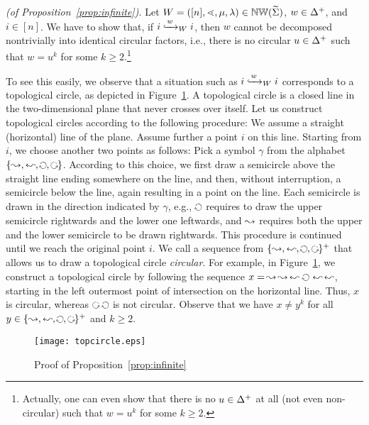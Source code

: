 \documentclass{LMCS}
\begin{document}
\begin{Proof}{\it (of Proposition~\ref{prop:infinite}).} Let $W =
  ([n],\succord,\mu,\lambda) \in \NW(\crSigma)$, $w \in \Dir^+$, and $i \in
  [n]$. We have to show that, if $\Wleadsto{W}{w}{i}{i}$, then $w$ cannot be
  decomposed nontrivially into identical circular factors, i.e., there is no
  circular $u \in \Dir^+$ such that $w = u^k$ for some $k \ge
  2$.\footnote{Actually, one can even show that there is no $u \in \Dir^+$ at
    all (not even non-circular) such that $w = u^k$ for some $k \ge 2$.}

  To see this easily, we observe that a situation such as
  $\Wleadsto{W}{w}{i}{i}$ corresponds to a topological circle, as depicted in
  Figure~\ref{fig:topcircle}. A topological circle is a closed line in the
  two-dimensional plane that never crosses over itself. Let us construct
  topological circles according to the following procedure: We assume a
  straight (horizontal) line of the plane. Assume further a point $i$ on this
  line. Starting from $i$, we choose another two points as follows: Pick a
  symbol $\gamma$ from the alphabet
  $\{\rightright,\leftleft,\rightleft,\leftright\}$. According to this choice,
  we first draw a semicircle above the straight line ending somewhere on the
  line, and then, without interruption, a semicircle below the line, again
  resulting in a point on the line. Each semicircle is drawn in the direction
  indicated by $\gamma$, e.g., $\rightleft$ requires to draw the upper
  semicircle rightwards and the lower one leftwards, and $\rightright$
  requires both the upper and the lower semicircle to be drawn rightwards.
  This procedure is continued until we reach the original point $i$. We call a
  sequence from $\{\rightright,\leftleft,\rightleft,\leftright\}^+$ that
  allows us to draw a topological circle \emph{circular}. For example, in
  Figure~\ref{fig:topcircle}, we construct a topological circle by following
  the sequence $x=~\!\rightright~\! \rightright~\! \leftleft~ \rightleft~
  \leftleft~\! \leftleft$, starting in the left outermost point of
  intersection on the horizontal line. Thus, $x$ is circular, whereas
  $\leftright~\rightleft$ is not circular. Observe that we have $x \neq y^k$
  for all $y \in \{\rightright,\leftleft,\rightleft,\leftright\}^+$ and $k \ge
  2$.


\begin{figure}[h]
\begin{center}
\texttt{[image: topcircle.eps]}
\caption{Proof of Proposition~\ref{prop:infinite}\label{fig:topcircle}}
\end{center}
\end{figure}


\end{Proof}
\end{document}
